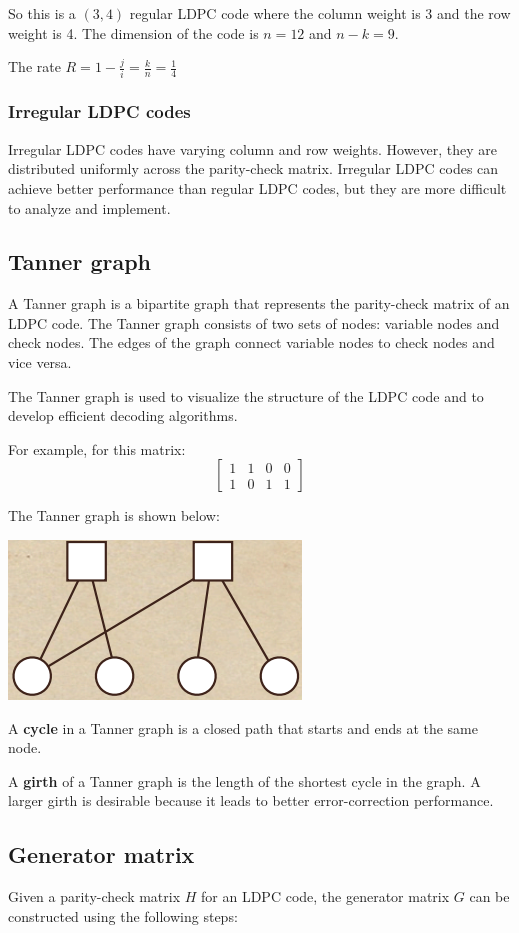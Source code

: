 \documentclass[letterpaper,12pt,oneside]{article}
\begin{document}
So this is a $(3,4)$ regular LDPC code where the column weight is 3 and the row weight is 4. The dimension of the code is $n=12$ and $n-k=9$. 

The rate $R=1-\frac{j}{i}=\frac{k}{n}=\frac{1}{4}$
\subsubsection{Irregular LDPC codes}
Irregular LDPC codes have varying column and row weights. However, they are distributed uniformly across the parity-check matrix. Irregular LDPC codes can achieve better performance than regular LDPC codes, but they are more difficult to analyze and implement.
\subsection{Tanner graph}
A Tanner graph is a bipartite graph that represents the parity-check matrix of an LDPC code. The Tanner graph consists of two sets of nodes: variable nodes and check nodes. The edges of the graph connect variable nodes to check nodes and vice versa. 

The Tanner graph is used to visualize the structure of the LDPC code and to develop efficient decoding algorithms.

For example, for this matrix: \[
    \begin{bmatrix}
        1 & 1 & 0 & 0\\
        1 & 0 & 1 & 1
    \end{bmatrix}
\]

The Tanner graph is shown below:

\includegraphics*{./Images/tanner_graph.png}

A \textbf{cycle} in a Tanner graph is a closed path that starts and ends at the same node. 

A \textbf{girth} of a Tanner graph is the length of the shortest cycle in the graph. A larger girth is desirable because it leads to better error-correction performance.
\subsection{Generator matrix}
Given a parity-check matrix $H$ for an LDPC code, the generator matrix $G$ can be constructed using the following steps:
\end{document}
